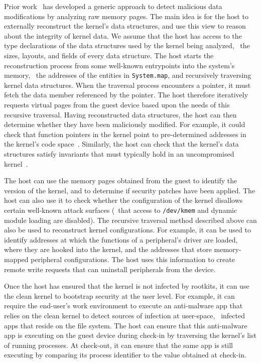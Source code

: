 Prior work~\cite{sbcfi:ccs07,gib:tdsc11,kop:ccs09,kop:sec12,strider:tr14}
has developed a generic approach to detect malicious data modifications by
analyzing raw memory pages. The main idea is for the host to externally
reconstruct the kernel's data structures, and use this view to reason about the
integrity of kernel data. We assume that the host has access to the type
declarations of the data structures used by the kernel being analyzed, \eg~the
sizes, layouts, and fields of every data structure.  The host starts the
reconstruction process from some well-known entrypoints into the system's
memory, \eg~the addresses of the entities in \texttt{System.map}, and
recursively traversing kernel data structures. When the traversal process
encounters a pointer, it must fetch the data member referenced by the pointer.
The host therefore iteratively requests virtual pages from the guest device
based upon the needs of this recursive traversal. Having reconstructed data
structures, the host can then determine whether they have been maliciously
modified. For example, it could check that function pointers in the kernel
point to pre-determined addresses in the kernel's code
space~\cite{sbcfi:ccs07}. Similarly, the host can check that the kernel's data
structures satisfy invariants that must typically hold in an uncompromised
kernel~\cite{gib:tdsc11}.

 The host can use the memory
pages obtained from the guest to identify the version of the kernel, and to
determine if security patches have been applied. The host can also use it to
check whether the configuration of the kernel disallows certain well-known
attack surfaces (\eg~that access to \texttt{/dev/kmem} and dynamic module
loading are disabled).  The recursive traversal method described above can also
be used to reconstruct kernel configurations.  For example, it can be used to
identify addresses at which the functions of a peripheral's driver are loaded,
where they are hooked into the kernel, and the addresses that store
memory-mapped peripheral configurations. The host uses this information to
create remote write requests that can uninstall peripherals from the device. 

 Once the host has ensured that
the kernel is not infected by rootkits, it can use the clean kernel to
bootstrap security at the user level. For example, it can require the
end-user's work environment to execute an anti-malware app that relies on the
clean kernel to detect sources of infection at user-space, \eg~infected apps
that reside on the file system. The host can ensure that this anti-malware app
is executing on the guest device during check-in by traversing the kernel's
list of running processes. At check-out, it can ensure that the same app is
still executing by comparing its process identifier to the value obtained
at check-in.


